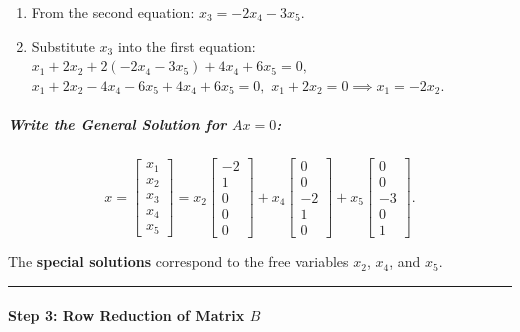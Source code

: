\documentclass[11pt]{article}
\begin{document}
\begin{enumerate}
\def\labelenumi{\arabic{enumi}.}
\item
  From the second equation: \(x_3 = -2x_4 - 3x_5.\)
\item
  Substitute \(x_3\) into the first equation:
  \(x_1 + 2x_2 + 2(-2x_4 - 3x_5) + 4x_4 + 6x_5 = 0,\)
  \(x_1 + 2x_2 - 4x_4 - 6x_5 + 4x_4 + 6x_5 = 0,\)
  \(x_1 + 2x_2 = 0 \implies x_1 = -2x_2.\)
\end{enumerate}

\subparagraph{\texorpdfstring{Write the General Solution for
\(Ax = 0\):}{Write the General Solution for Ax = 0:}}\label{write-the-general-solution-for-ax-0}

\[
x =
\begin{bmatrix}
x_1 \\ x_2 \\ x_3 \\ x_4 \\ x_5
\end{bmatrix} =
x_2
\begin{bmatrix}
-2 \\ 1 \\ 0 \\ 0 \\ 0
\end{bmatrix} +
x_4
\begin{bmatrix}
0 \\ 0 \\ -2 \\ 1 \\ 0
\end{bmatrix} +
x_5
\begin{bmatrix}
0 \\ 0 \\ -3 \\ 0 \\ 1
\end{bmatrix}.
\]

The \textbf{special solutions} correspond to the free variables \(x_2\),
\(x_4\), and \(x_5\).

\begin{center}\rule{0.5\linewidth}{0.5pt}\end{center}

\paragraph{\texorpdfstring{Step 3: Row Reduction of Matrix
\(B\)}{Step 3: Row Reduction of Matrix B}}\label{step-3-row-reduction-of-matrix-b}
\end{document}
